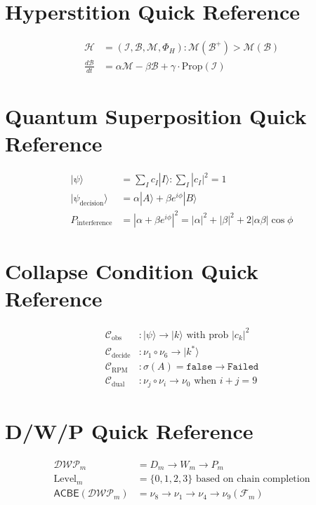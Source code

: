 \documentclass[11pt,twoside]{book}
\newcommand{\noe}[1]{\nu_{#1}}
\newcommand{\Foundations}{\mathcal{F}}
\newcommand{\Frac}{\Phi}
\newcommand{\ACBE}{\mathsf{ACBE}}
\newcommand{\Failed}{\mathtt{Failed}}
\newcommand{\Hyperstition}{\mathcal{H}}
\newcommand{\Collapse}{\mathcal{C}}
\newcommand{\DWP}{\mathcal{DWP}}
\begin{document}
\section{Hyperstition Quick Reference}
\begin{align}
    \Hyperstition &= (\mathcal{I}, \mathcal{B}, \mathcal{M}, \Frac_H) : \mathcal{M}(\mathcal{B}^+) > \mathcal{M}(\mathcal{B}) \\
    \frac{d\mathcal{B}}{dt} &= \alpha \mathcal{M} - \beta \mathcal{B} + \gamma \cdot \mathrm{Prop}(\mathcal{I})
\end{align}

\section{Quantum Superposition Quick Reference}
\begin{align}
    |\psi\rangle &= \sum_I c_I |I\rangle : \sum_I |c_I|^2 = 1 \\
    |\psi_{\mathrm{decision}}\rangle &= \alpha|A\rangle + \beta e^{i\phi}|B\rangle \\
    P_{\mathrm{interference}} &= |\alpha + \beta e^{i\phi}|^2 = |\alpha|^2 + |\beta|^2 + 2|\alpha\beta|\cos\phi
\end{align}

\section{Collapse Condition Quick Reference}
\begin{align}
    \Collapse_{\mathrm{obs}} &: |\psi\rangle \to |k\rangle \text{ with prob } |c_k|^2 \\
    \Collapse_{\mathrm{decide}} &: \noe{1} \circ \noe{6} \to |k^*\rangle \\
    \Collapse_{\mathrm{RPM}} &: \sigma(A) = \mathtt{false} \to \Failed \\
    \Collapse_{\mathrm{dual}} &: \noe{j} \circ \noe{i} \to \noe{0} \text{ when } i+j=9
\end{align}

\section{D/W/P Quick Reference}
\begin{align}
    \DWP_m &= D_m \to W_m \to P_m \\
    \mathrm{Level}_m &= \{0, 1, 2, 3\} \text{ based on chain completion} \\
    \ACBE(\DWP_m) &= \noe{8} \to \noe{1} \to \noe{4} \to \noe{9}(\Foundations_m)
\end{align}
\end{document}
